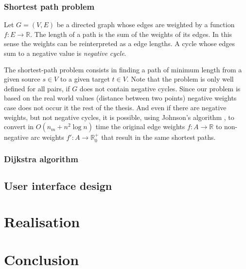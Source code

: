 \documentclass[thesis=M,english]{FITthesis}[2012/10/20]
\begin{document}
\subsection{Shortest path problem}
Let $G = (V, E)$ be a directed graph whose edges are weighted by a function $f: E \to \mathbb{R}$. 
The length of a path is the sum of the weights of its edges. In this sense the weights can be reinterpreted as a edge lengths. A cycle whose edges sum to a negative value is \textit{negative cycle}.  

The shortest-path problem consists in finding a path of minimum length from a given source $s \in V$ to a given target $t \in V$.
Note that the problem is only well defined for all pairs, if $G$ does not contain negative cycles.
Since our problem is based on the real world values (distance between two points) negative weights case does not occur it the rest of the thesis.
And even if there are negative weights, but not negative cycles, it is possible, using Johnson's algorithm \cite{Johnson77}, to convert in $O(n_m + n^2 \log n)$ time the original edge weights $f: A \to \mathbb{R}$ to non-negative arc weights $ f': A \to \mathbb{R}^+_0$ that result in the same shortest paths.

\subsection{Dijkstra algorithm}

\section{User interface design}

\chapter{Realisation}

\chapter{Conclusion}





\appendix
\end{document}
